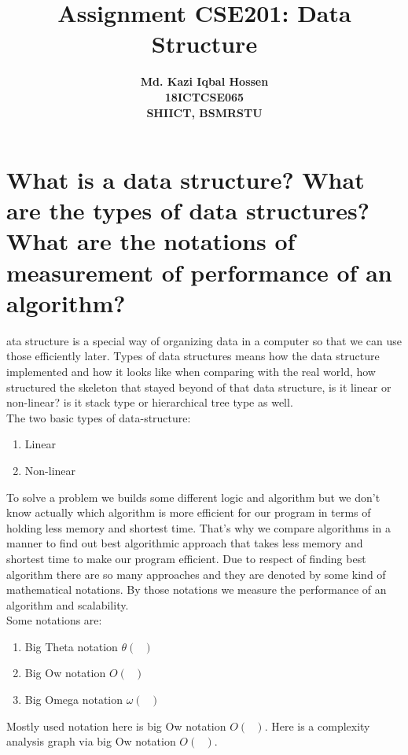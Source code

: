 \documentclass[11 pt]{article}
\title{Assignment CSE201: Data Structure}
\author{\textbf{Md. Kazi Iqbal Hossen}\\\textbf{18ICTCSE065}\\\textbf{SHIICT, BSMRSTU}}
\begin{document}
\pagecolor{LightSlateGray}

\pagecolor{white}
\tableofcontents
\listoffigures
\pagebreak

\section{What is a data structure? What are the types of data structures? What are the notations of measurement of performance of an algorithm?}
\justify
{
ata structure is a special way of organizing data in a computer so that we can use those efficiently later. Types of data structures means how the data structure implemented and how it looks like when comparing with the real world, how structured the skeleton that stayed beyond of that data structure, is it linear or non-linear? is it stack type or hierarchical tree type as well.\\
The two basic types of data-structure:
\begin{enumerate}
	\item Linear
	\item Non-linear
\end{enumerate}
To solve a problem we builds some different logic and algorithm but we don't know actually which algorithm is more efficient for our program in terms of holding less memory and shortest time. That's why we compare algorithms in a manner to find out best algorithmic approach that takes less memory and shortest time to make our program efficient. Due to respect of finding best algorithm there are so many approaches and they are denoted by some kind of mathematical notations. By those notations we measure the performance of an algorithm and scalability.\\
Some notations are:
\begin{enumerate}
	\item Big Theta notation $\theta(\textrm{ })$
	\item Big Ow notation $O(\textrm{ })$
	\item Big Omega notation $\omega(\textrm{ })$
\end{enumerate}
 Mostly used notation here is big Ow notation $O(\textrm{ })$. Here is a complexity analysis graph via big Ow notation $O(\textrm{ })$.
}
\end{document}
